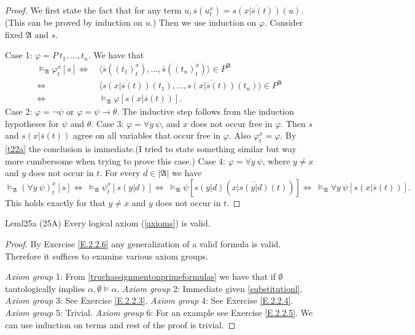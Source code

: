 \begin{proof}
  We first state the fact that for any term $u,\overline{s}(u_t^x)=\overline{s(x|\overline{s}(t))}(u).$ (This can be proved by induction on $u$.) Then we use induction on $\varphi$. Consider fixed $\mathfrak{A}$ and $s$.

  Case 1: $\varphi=P\ t_1,\dots,t_n.$ We have that
  \begin{align*}
    \vDash_{\mathfrak{A}}\varphi_t^x[s]\Leftrightarrow & \ \langle \overline{s}((t_1)_t^x),\dots,\overline{s}((t_n)_t^x)\rangle\in P^{\mathfrak{A}} \\ \Leftrightarrow& \ \langle\overline{s(x|\overline{s}(t))}(t_1),\dots,\overline{s(x|\overline{s}(t))}(t_n)\rangle\in P^{\mathfrak{A}}\\ \Leftrightarrow& \ \vDash_{\mathfrak{A}}\varphi[s(x|\overline{s}(t))].
  \end{align*}
  Case 2: $\varphi=\neg \psi$ or $\varphi=\psi\rightarrow \theta$. The inductive step follows from the induction hypotheses for $\psi$ and $\theta$.\newline
  Case 3: $\varphi=\forall y\ \psi$, and $x$ does not occur free in $\varphi$. Then $s$ and $s(x|\bar{s}(t))$ agree on all variables that occur free in $\varphi$. Also $\varphi_t^x=\varphi$. By \ref{t22a} the conclusion is immediate.(I tried to state something similar but way more cumbersome when trying to prove this case.)\newline
  Case 4: $\varphi=\forall y\ \psi$, where $y\neq x$ and $y$ does not occur in $t$. For every $d\in|\mathfrak{A}|$ we have
  \[
    \vDash_{\mathfrak{A}}(\forall y\ \psi)_t^x[s]\Leftrightarrow\ \vDash_{\mathfrak{A}}\psi_t^x[s(y|d)]\Leftrightarrow\ \vDash_{\mathfrak{A}}\psi[s(y|d)(x|\overline{s(y|d)}(t))]\Leftrightarrow\ \vDash_{\mathfrak{A}}\forall y\ \psi[s(x|\overline{s}(t))].
  \]
  This holds exactly for that $y\neq x$ and $y$ does not occur in $t$.
\end{proof}

\begin{reference}{Lem}{l25a}
  (25A) Every logical axiom (\ref{axioms}) is valid.
\end{reference}

\begin{proof}
  By Exercise \ref{E.2.2.6} any generalization of a valid formula is valid. Therefore it suffices to examine various axiom groups.

  \textit{Axiom group} 1: From \ref{truchassignmentonprimeformulas} we have that if $\emptyset$ tautologically implies $\alpha,\emptyset\vDash \alpha$.\newline
  \textit{Axiom group} 2: Immediate given \ref{substitutionl}.\newline
  \textit{Axiom group} 3: See Exercise \ref{E.2.2.3}.\newline
  \textit{Axiom group} 4: See Exercise \ref{E.2.2.4}.\newline
  \textit{Axiom group} 5: Trivial.\newline
  \textit{Axiom group} 6: For an example see Exercise \ref{E.2.2.5}. We can use induction on terms and rest of the proof is trivial.
\end{proof}

